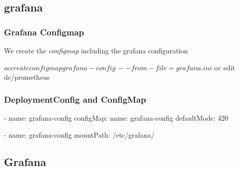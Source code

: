 \subsection{grafana}

\begin{frame}[fragile]
  \frametitle{Grafana Configmap}
  We create the \emph{configmap} including the grafana configuration \\
  \begin{bashcode}
    $ oc create configmap grafana-config \
    --from-file=grafana.ini
    $ oc edit dc/prometheus
  \end{bashcode}
\end{frame}

\begin{frame}[fragile]
  \frametitle{DeploymentConfig and ConfigMap}

  \begin{yamlcode}
    - name: grafana-config
      configMap:
        name: grafana-config
        defaultMode: 420
  \end{yamlcode}

  \begin{yamlcode}
    - name: grafana-config
      mountPath: /etc/grafana/
  \end{yamlcode}
\end{frame}

\subsection{Grafana}